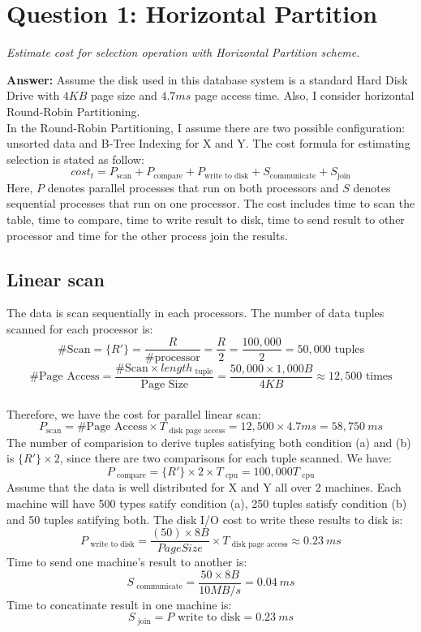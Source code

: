 \documentclass[a4paper,12pt]{article}
\begin{document}
\pagebreak

\section*{Question 1: Horizontal Partition}
\setcounter{section}{1}

\textit{Estimate cost for selection operation with Horizontal Partition scheme.} 

\vspace{1.5em}
\noindent
\textbf{Answer:} 
\noindent
Assume the disk used in this database system is a standard Hard Disk Drive with $4KB$ page size and $4.7ms$ page access time. Also, I consider horizontal Round-Robin Partitioning. \\
\noindent
In the Round-Robin Partitioning, I assume there are two possible configuration: unsorted data and B-Tree Indexing for X and Y. The cost formula for estimating selection is stated as follow:
$$ cost_{ t} = P_{\mbox{scan}} + P_{\mbox{compare}} + P_{\mbox{write to disk}} + S_{\mbox{communicate}} + S_{\mbox{join}} $$
Here, $P$ denotes parallel processes that run on both processors and $S$ denotes sequential processes that run on one processor. The cost includes time to scan the table, time to compare, time to write result to disk, time to send result to other processor and time for the other process join the results.
\subsection{Linear scan}
The data is scan sequentially in each processors. The number of data tuples scanned for each processor is:
$$ \#\mbox{Scan} = \{R'\} = \frac{R}{\#\mbox{processor}} = \frac{R}{2} = \frac{100,000}{2} = 50,000 \mbox{ tuples}$$
$$ \#\mbox{Page Access} = \frac{\#\mbox{Scan} \times length_{\mbox{ tuple}}}{\mbox{Page Size}} = \frac{50,000 \times 1,000B}{4KB} \approx 12,500 \mbox{ times} $$ \\[0.3em]
Therefore, we have the cost for parallel linear scan:
$$ P_{\mbox{scan}} = \#\mbox{Page Access} \times T_{\mbox{ disk page access}} = 12,500 \times 4.7ms = 58,750\ ms $$
The number of comparision to derive tuples satisfying both condition (a) and (b) is $\{R'\} \times 2$, since there are two comparisons for each tuple scanned. We have:
$$ P_{\mbox{ compare}} = \{R'\} \times 2 \times T_{\mbox{ cpu}} = 100,000 T_{\mbox{ cpu}} $$
Assume that the data is well distributed for X and Y all over 2 machines. Each machine will have 500 types satify condition (a), 250 tuples satisfy condition (b) and 50 tuples satifying both. The disk I/O cost to write these results to disk is:
$$ P_{\mbox{ write to disk}} = \frac{(50) \times 8B}{Page Size} \times T_{\mbox{ disk page access}} \approx 0.23\ ms $$ 
Time to send one machine's result to another is:
$$ S_{\mbox{ communicate}} = \frac{50 \times 8B}{10MB/s} = 0.04\ ms $$
Time to concatinate result in one machine is:
$$ S_{\mbox{ join}} = P{\mbox{ write to disk}} = 0.23\ ms $$
\end{document}
